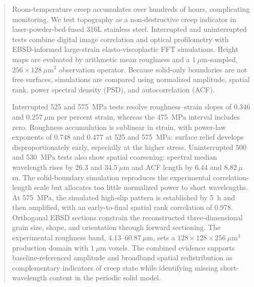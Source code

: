 \documentclass[final,12pt]{cas-sc}
\begin{document}
\begin{abstract}
Room-temperature creep accumulates over hundreds of hours, complicating monitoring. We test topography as a non-destructive creep indicator in laser-powder-bed-fused 316L stainless steel. Interrupted and uninterrupted tests combine digital image correlation and optical profilometry with EBSD-informed large-strain elasto-viscoplastic FFT simulations. Height maps are evaluated by arithmetic mean roughness and a $1~\mu$m-sampled, $256\times128~\mu\mathrm{m}^2$ observation operator. Because solid-only boundaries are not free surfaces, simulations are compared using normalized amplitude, spatial rank, power spectral density (PSD), and autocorrelation (ACF).

Interrupted 525 and 575~MPa tests resolve roughness--strain slopes of $0.346$ and $0.257~\mu$m per percent strain, whereas the 475~MPa interval includes zero. Roughness accumulation is sublinear in strain, with power-law exponents of $0.748$ and $0.477$ at 525 and 575~MPa: surface relief develops disproportionately early, especially at the higher stress. Uninterrupted 500 and 530~MPa tests also show spatial coarsening: spectral median wavelength rises by $26.3$ and $34.5~\mu$m and ACF length by $6.44$ and $8.82~\mu$m. The solid-boundary simulation reproduces the experimental correlation-length scale but allocates too little normalized power to short wavelengths. At 575~MPa, the simulated high-slip pattern is established by 5~h and then amplified, with an early-to-final spatial rank correlation of 0.978. Orthogonal EBSD sections constrain the reconstructed three-dimensional grain size, shape, and orientation through forward sectioning. The experimental roughness band, $4.13$--$60.87~\mu$m, sets a $128\times128\times256~\mu\mathrm{m}^3$ production domain with $1~\mu$m voxels. The combined evidence supports baseline-referenced amplitude and broadband spatial redistribution as complementary indicators of creep state while identifying missing short-wavelength content in the periodic solid model.
\end{abstract}

\end{document}
